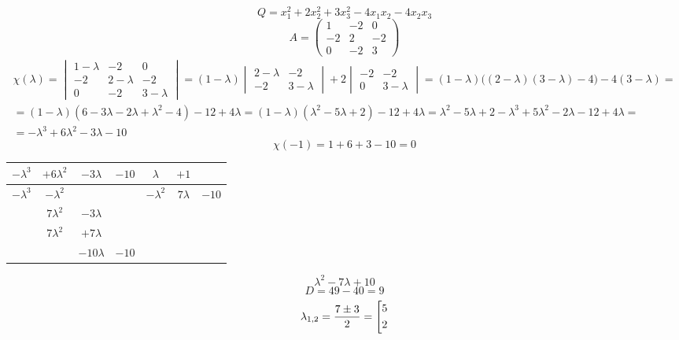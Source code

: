 $$ Q = x_1^2 + 2x_2^2 + 3x_3^2 - 4x_1x_2 - 4x_2x_3 $$
$$ A =
\begin{pmatrix}
	1 & -2 & 0 \\
    -2 & 2 & -2 \\
    0 & -2 & 3
\end{pmatrix} $$
\begin{multline*}
    \chi(\lambda) =
    \begin{vmatrix}
        1 - \lambda & -2 & 0 \\
        -2 & 2 - \lambda & -2 \\
        0 & -2 & 3 - \lambda
    \end{vmatrix} = (1 - \lambda)
    \begin{vmatrix}
    	2 - \lambda & -2 \\
        -2 & 3 - \lambda
    \end{vmatrix} + 2
    \begin{vmatrix}
    	-2 & -2 \\
        0 & 3 - \lambda
    \end{vmatrix} = (1 - \lambda) \bigg( (2 - \lambda)(3 - \lambda) - 4 \bigg) - 4(3 - \lambda) = \\
    = (1 - \lambda)(6 - 3\lambda - 2\lambda + \lambda^2 - 4) - 12 + 4\lambda = (1 - \lambda)(\lambda^2 - 5\lambda + 2) - 12 + 4\lambda = \lambda^2 - 5\lambda + 2 - \lambda^3 + 5\lambda^2 - 2\lambda - 12 + 4\lambda = \\
    = -\lambda^3 + 6\lambda^2 - 3\lambda - 10
\end{multline*}
$$ \chi(-1) = 1 + 6 + 3 - 10 = 0 $$
\begin{tabular}{c c c c | c c c}
	$ -\lambda^3 $ & $ +6\lambda^2 $ & $ -3\lambda $ & $ -10 $ & $ \lambda $ & $ +1 $ \\
    \hline
    $ -\lambda^3 $ & $ -\lambda^2 $ & & & $ -\lambda^2 $ & $ 7\lambda $ & $ -10 $ \\
    \hline
    & $ 7\lambda^2 $ & $ -3\lambda $ & \\
    & $ 7\lambda^2 $ & $ +7\lambda $ & \\
    \hline
    & & $ -10\lambda $ & $ -10 $
\end{tabular}
$$ \lambda^2 - 7\lambda + 10 $$
$$ D = 49 - 40 = 9 $$
$$ \lambda_{1,2} = \half[7 \pm 3] = \left[
\begin{aligned}
	5 \\
    2
\end{aligned} \right. $$
